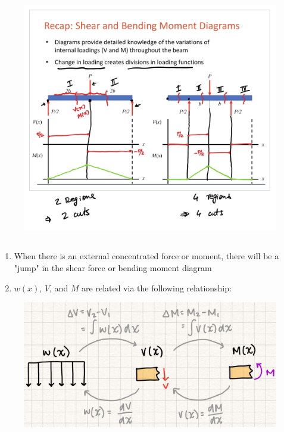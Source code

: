\begin{figure}[!h]
\centering
\includegraphics[angle=0, width=\textwidth]{IntForceFigures/IntLoadRecap.png}
\vspace{-2mm}
\caption{\small {}}
\vspace{-3mm}
\label{Fig:DiagramProcedure}
\end{figure}

\subsection{}

\begin{enumerate}
    \item When there is an external concentrated force or moment, there will be a "jump" in the shear force or bending moment diagram
    \item $w(x)$, $V$, and $M$ are related via the following relationship: 
\end{enumerate}

\begin{figure}[!h]
\centering
\includegraphics[angle=0, width=\textwidth]{IntForceFigures/IntDerivRelationships.jpg}
\vspace{-2mm}
\caption{\small {}}
\vspace{-3mm}
\label{Fig:IntForceRelationships}
\end{figure}

